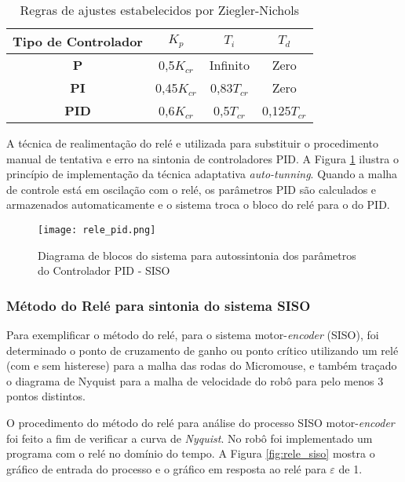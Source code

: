 \begin{table}[!htb]
	\centering
	\caption{\label{tab:zieglenichols}Regras de ajustes estabelecidos por Ziegler-Nichols}
		\begin{tabular}{c|ccc}
		\textbf{Tipo de Controlador} & \textbf{$K_p$} & \textbf{$T_i$} & \textbf{$T_d$} \\ 
		\hline 
		\textbf{P} & 0,5$K_{cr}$ & Infinito & Zero \\ 
		\hline 
		\textbf{PI} & 0,45$K_{cr}$ & 0,83$T_{cr}$ & Zero \\ 
		\hline 
		\textbf{PID} & 0,6$K_{cr}$ & 0,5$T_{cr}$ & 0,125$T_{cr}$ \\ 
		\end{tabular} 
\end{table}
	

A técnica de realimentação do relé e utilizada para substituir o procedimento manual de tentativa e erro na sintonia de controladores PID. A Figura \ref{fig:controle_rele_pid} ilustra o princípio de implementação da técnica adaptativa \emph{auto-tunning}. Quando a malha de controle está em oscilação com o relé, os parâmetros PID são calculados e armazenados automaticamente e o sistema troca o bloco do relé para o do PID. 

\begin{figure}[!htb]
	\caption{\label{fig:controle_rele_pid}Diagrama de blocos do sistema para autossintonia dos parâmetros do Controlador PID - SISO}
	\begin{center}
		\texttt{[image: rele\_pid.png]}
	\end{center}
\end{figure}
	\subsubsection{Método do Relé para sintonia do sistema SISO}
	Para exemplificar o método do relé, para o sistema motor-\textit{encoder} (SISO), foi determinado o ponto de cruzamento de ganho ou ponto crítico utilizando um relé (com e sem histerese) para a malha das rodas do Micromouse, e também traçado o diagrama de Nyquist para a malha de velocidade do robô para pelo menos 3 pontos distintos.

	O procedimento do método do relé para análise do processo SISO motor-\textit{encoder} foi feito a fim de verificar a curva de \emph{Nyquist}. No robô foi implementado um programa com o relé no domínio do tempo. A Figura \ref{fig:rele_siso} mostra o gráfico de entrada do processo e o gráfico em resposta ao relé para $\varepsilon$ de 1.

